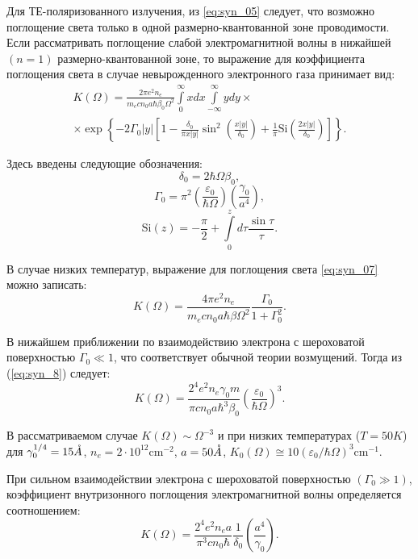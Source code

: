 Для ТЕ-поляризованного излучения, из \eqref{eq:syn_05} следует, что  возможно поглощение света только в одной размерно-квантованной зоне проводимости. Если рассматривать поглощение слабой электромагнитной волны в нижайшей $(n=1)$ размерно-квантованной зоне, то выражение для коэффициента поглощения света в случае невырожденного электронного газа принимает вид:
\begin{multline} \label{eq:syn_07}
K(\Omega) = \frac{2 \pi e^2 n_e }{m_e c n_0 a \hbar \beta_0 \Omega^2} \int\limits_0^{\infty}x dx \int\limits_{-\infty}^{\infty}y dy \times \\
\times \exp{\left\lbrace  - 2\Gamma_0 |y| \left[ 1 - \frac{\delta_0}{\pi x |y|}\sin^2{\left( \frac{x|y|}{\delta_0}\right) } + \frac{1}{\pi} \mathrm{Si}{\left( \frac{2x|y|}{\delta_0}\right) } \right]  \right\rbrace   }.
\end{multline} 

Здесь введены следующие обозначения:
\[
\delta_0 = 2\hbar \Omega \beta_0,
\]
\[
\Gamma_0 = \pi^2 \left(\frac{\varepsilon_0}{\hbar \Omega} \right) \left( \frac{\gamma_0}{a^4} \right),
\]
\[
\mathrm{Si}(z) = -\frac{\pi}{2} + \int\limits_0^z{d\tau\frac{\sin{\tau}}{\tau}}.
\]

В случае низких температур, выражение для поглощения света \eqref{eq:syn_07} можно записать:
\begin{equation} \label{eq:syn_8}
K(\Omega )=\frac{4\pi e^{2} n_{e} }{m_e c n_0 a \hbar\beta \Omega^2 } \frac{\Gamma_0 }{1+\Gamma_0^2 }.
\end{equation} 

В нижайшем приближении по взаимодействию электрона с шероховатой поверхностью $\Gamma_0 \ll 1$, что соответствует обычной теории возмущений. Тогда из (\ref{eq:syn_8}) следует:
\begin{equation} \label{eq:syn_9}
K(\Omega )=\frac{2^4 e^2 n_e \gamma_0 m}{\pi c n_0 a\hbar^3 \beta_0 } \left(\frac{\varepsilon_0 }{\hbar\Omega } \right)^3.
\end{equation} 

В рассматриваемом случае $K(\Omega )\sim \Omega^{-3} $ и при низких температурах ($T=50 K$) для $\gamma_0^{1/4} =15 \AA$, $n_e = 2\cdot 10^{12} \text{cm}^{-2} $, $a=50 \AA$, $K_0 (\Omega )\cong 10\left(\varepsilon_0 / \hbar\Omega \right)^3 \text{cm}^{-1} $.

При сильном взаимодействии электрона с шероховатой поверхностью $\left( \Gamma_0 \gg 1 \right) $, коэффициент внутризонного поглощения электромагнитной волны определяется соотношением:
\begin{equation} \label{eq:syn_10}
K(\Omega )=\frac{2^4 e^2 n_e a}{\pi^3 cn_0 \hbar } \frac{1}{\delta_0 } \left(\frac{a^4 }{\gamma_0 } \right).
\end{equation} 

